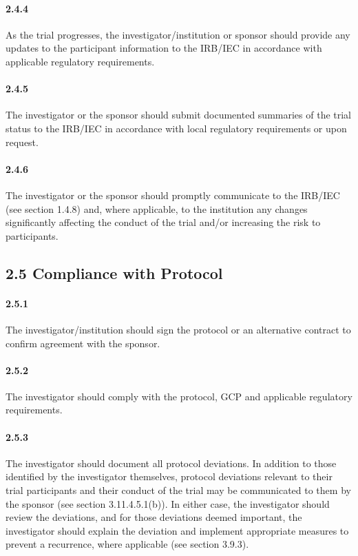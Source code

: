 \documentclass[11pt]{article}
\begin{document}
\paragraph{2.4.4} As the trial progresses, the investigator/institution or sponsor should provide any updates to the participant information to the IRB/IEC in accordance with applicable regulatory requirements.

\paragraph{2.4.5} The investigator or the sponsor should submit documented summaries of the trial status to the IRB/IEC in accordance with local regulatory requirements or upon request.

\paragraph{2.4.6} The investigator or the sponsor should promptly communicate to the IRB/IEC (see section 1.4.8) and, where applicable, to the institution any changes significantly affecting the conduct of the trial and/or increasing the risk to participants.

\subsection{2.5 Compliance with Protocol}

\paragraph{2.5.1} The investigator/institution should sign the protocol or an alternative contract to confirm agreement with the sponsor.

\paragraph{2.5.2} The investigator should comply with the protocol, GCP and applicable regulatory requirements.

\paragraph{2.5.3} The investigator should document all protocol deviations. In addition to those identified by the investigator themselves, protocol deviations relevant to their trial participants and their conduct of the trial may be communicated to them by the sponsor (see section 3.11.4.5.1(b)). In either case, the investigator should review the deviations, and for those deviations deemed important, the investigator should explain the deviation and implement appropriate measures to prevent a recurrence, where applicable (see section 3.9.3).
\end{document}
